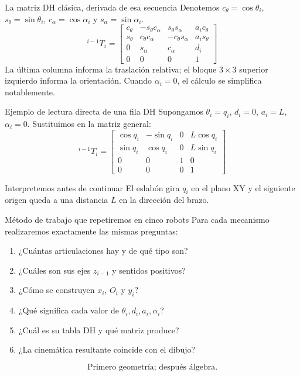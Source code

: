 \documentclass[aspectratio=169,11pt]{beamer}
\begin{document}
\begin{frame}[t]{La matriz DH clásica, derivada de esa secuencia}
 \scriptsize
 Denotemos $c_\theta=\cos\theta_i$, $s_\theta=\sin\theta_i$,
 $c_\alpha=\cos\alpha_i$ y $s_\alpha=\sin\alpha_i$.
 \[
 \boxed{{}^{i-1}T_i=\begin{bmatrix}
 c_\theta&-s_\theta c_\alpha&s_\theta s_\alpha&a_ic_\theta\\
 s_\theta&c_\theta c_\alpha&-c_\theta s_\alpha&a_is_\theta\\
 0&s_\alpha&c_\alpha&d_i\\
 0&0&0&1
 \end{bmatrix}}
 \]
 \pause
 \small
 La última columna informa la traslación relativa;
 el bloque $3\times3$ superior izquierdo informa la orientación.
 Cuando $\alpha_i=0$, el cálculo se simplifica notablemente.
\end{frame}

\begin{frame}[t]{Ejemplo de lectura directa de una fila DH}
 \small
 Supongamos $\theta_i=q_i$, $d_i=0$, $a_i=L$,
 $\alpha_i=0$. Sustituimos en la matriz general:
 \[
 \boxed{{}^{i-1}T_i=\begin{bmatrix}
 \cos q_i&-\sin q_i&0&L\cos q_i\\
 \sin q_i&\cos q_i&0&L\sin q_i\\
 0&0&1&0\\0&0&0&1
 \end{bmatrix}}
 \]
 \pause
 \begin{block}{Interpretemos antes de continuar}
 El eslabón gira $q_i$ en el plano XY y el siguiente origen
 queda a una distancia $L$ en la dirección del brazo.
 \end{block}
\end{frame}

\begin{frame}[t]{Método de trabajo que repetiremos en cinco robots}
 \small
 Para cada mecanismo realizaremos exactamente las mismas preguntas:
 \begin{enumerate}
 \item ¿Cuántas articulaciones hay y de qué tipo son?
 \item ¿Cuáles son sus ejes $z_{i-1}$ y sentidos positivos?
 \item ¿Cómo se construyen $x_i$, $O_i$ y $y_i$?
 \item ¿Qué significa cada valor de $\theta_i,d_i,a_i,\alpha_i$?
 \item ¿Cuál es su tabla DH y qué matriz produce?
 \item ¿La cinemática resultante coincide con el dibujo?
 \end{enumerate}
 \pause
 \centering\[\boxed{\text{Primero geometría; después álgebra.}}\]
\end{frame}
\end{document}
